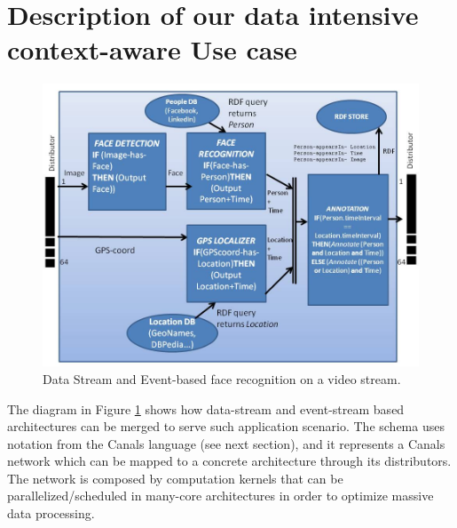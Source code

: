 \documentclass[[10pt,abbrv]{llncs}
\begin{document}
\section{Description of our data intensive context-aware Use case}


\begin{figure}[tb]
\centering
\includegraphics[width=13.5cm]{images/ApplicationEvent-StreamDataflow.jpg}
\caption{Data Stream and Event-based face recognition on a video stream.}
\label{fig:dataflow}
\end{figure}

The diagram in Figure \ref{fig:dataflow} shows how data-stream and event-stream based architectures can be merged to serve such application scenario. The schema uses notation from the Canals language (see next section), and it represents a Canals network which can be mapped to a concrete architecture through its distributors. The network is composed by computation kernels that can be parallelized/scheduled in many-core architectures in order to optimize massive data processing.
\end{document}
